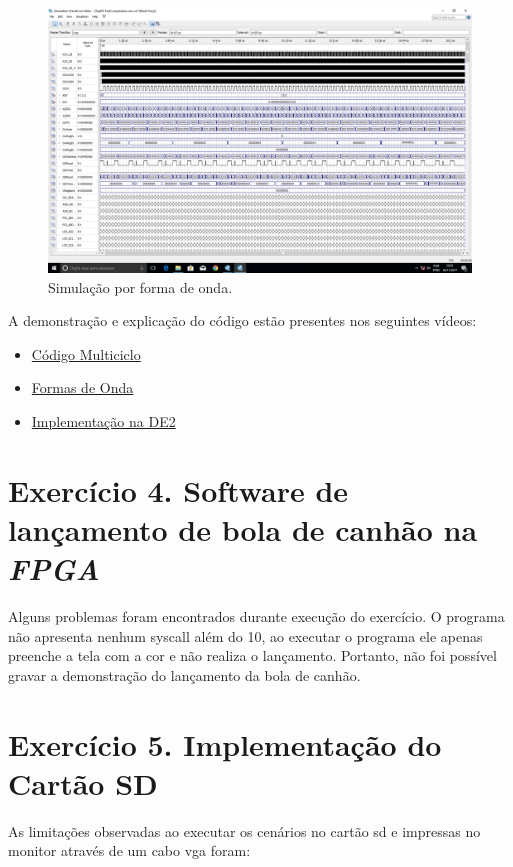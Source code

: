 \documentclass[12pt]{article}
\begin{document}
\begin{figure}[H]
	\flushleft
	\includegraphics[width=1\textwidth]{waveform.png}
	\caption{Simulação por forma de onda.}
	\label{fig:pfunct}
\end{figure}

A demonstração e explicação do código estão presentes nos seguintes vídeos:

\begin{itemize}
\item \href{https://youtu.be/byjAeoPzvlc}{Código Multiciclo}
\item \href{https://youtu.be/1yfLxiZ4ztI}{Formas de Onda}
\item \href{https://youtu.be/0KF8iVj7nfM}{Implementação na DE2} 
\end{itemize}


\section{Exercício 4. Software de lançamento de bola de canhão na \textit{FPGA}}
\label{sec:canhao}

Alguns problemas foram encontrados durante execução do exercício. O programa não apresenta nenhum syscall além do 10, ao executar o programa ele apenas preenche a tela com a cor e não realiza o lançamento. Portanto, não foi possível gravar a demonstração do lançamento da bola de canhão.


\section{Exercício 5. Implementação do Cartão SD}
\label{sec:cartaosd}

As limitações observadas ao executar os cenários no cartão sd e impressas no monitor através de um cabo vga foram:
\end{document}
